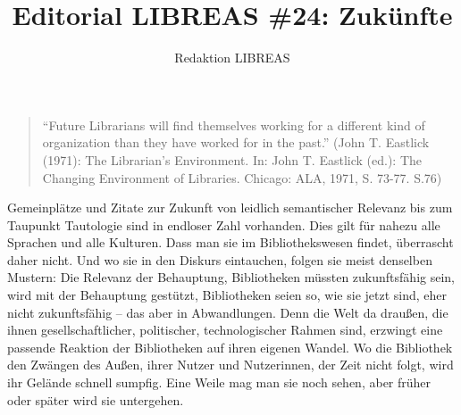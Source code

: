 \documentclass[a4paper,
fontsize=11pt,
oneside,
numbers=noperiodatend,
parskip=half-,
bibliography=totoc,
final
]{scrartcl}
\title{\LARGE{Editorial LIBREAS \#24: Zukünfte}} %
\author{Redaktion LIBREAS} %
\date{}
\begin{document}
\maketitle
\thispagestyle{fancyplain} 


\begin{quote}
\enquote{Future Librarians will find themselves working for a different
kind of organization than they have worked for in the past.} (John T.
Eastlick (1971): The Librarian's Environment. In: John T. Eastlick
(ed.): The Changing Environment of Libraries. Chicago: ALA, 1971, S.
73-77. S.76)
\end{quote}

Gemeinplätze und Zitate zur Zukunft von leidlich semantischer Relevanz
bis zum Taupunkt Tautologie sind in endloser Zahl vorhanden. Dies gilt
für nahezu alle Sprachen und alle Kulturen. Dass man sie im
Bibliothekswesen findet, überrascht daher nicht. Und wo sie in den
Diskurs eintauchen, folgen sie meist denselben Mustern: Die Relevanz der
Behauptung, Bibliotheken müssten zukunftsfähig sein, wird mit der
Behauptung gestützt, Bibliotheken seien so, wie sie jetzt sind, eher
nicht zukunftsfähig -- das aber in Abwandlungen. Denn die Welt da
draußen, die ihnen gesellschaftlicher, politischer, technologischer
Rahmen sind, erzwingt eine passende Reaktion der Bibliotheken auf ihren
eigenen Wandel. Wo die Bibliothek den Zwängen des Außen, ihrer Nutzer
und Nutzerinnen, der Zeit nicht folgt, wird ihr Gelände schnell sumpfig.
Eine Weile mag man sie noch sehen, aber früher oder später wird sie
untergehen.
\end{document}
